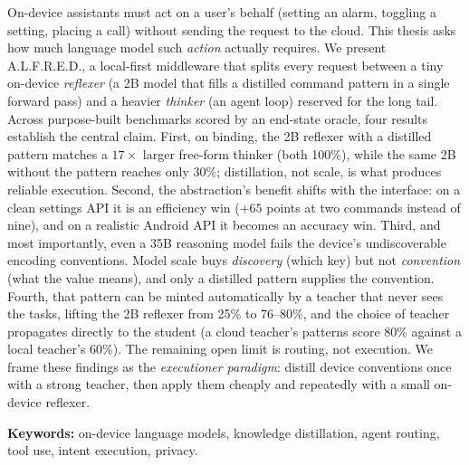 On-device assistants must act on a user's behalf (setting an alarm, toggling a
setting, placing a call) without sending the request to the cloud. This thesis
asks how much language model such \emph{action} actually requires. We present
A.L.F.R.E.D., a local-first middleware that splits every request between a tiny
on-device \emph{reflexer} (a 2B model that fills a distilled command pattern in a
single forward pass) and a heavier \emph{thinker} (an agent loop) reserved for the
long tail. Across purpose-built benchmarks scored by an end-state oracle, four
results establish the central claim. First, on binding, the 2B reflexer with a
distilled pattern matches a $17\times$ larger free-form thinker (both 100\%),
while the same 2B without the pattern reaches only 30\%; distillation, not scale,
is what produces reliable execution. Second, the abstraction's benefit shifts with
the interface: on a clean settings API it is an efficiency win ($+65$ points at two
commands instead of nine), and on a realistic Android API it becomes an accuracy
win. Third, and most importantly, even a 35B reasoning model fails the device's
undiscoverable encoding conventions. Model scale buys \emph{discovery} (which key)
but not \emph{convention} (what the value means), and only a distilled pattern
supplies the convention. Fourth, that pattern can be minted automatically by a
teacher that never sees the tasks, lifting the 2B reflexer from 25\% to 76--80\%,
and the choice of teacher propagates directly to the student (a cloud teacher's
patterns score 80\% against a local teacher's 60\%). The remaining open limit is
routing, not execution. We frame these findings as the \emph{executioner
paradigm}: distill device conventions once with a strong teacher, then apply them
cheaply and repeatedly with a small on-device reflexer.

\vspace{0.6em}
\noindent\textbf{Keywords:} on-device language models, knowledge distillation,
agent routing, tool use, intent execution, privacy.
